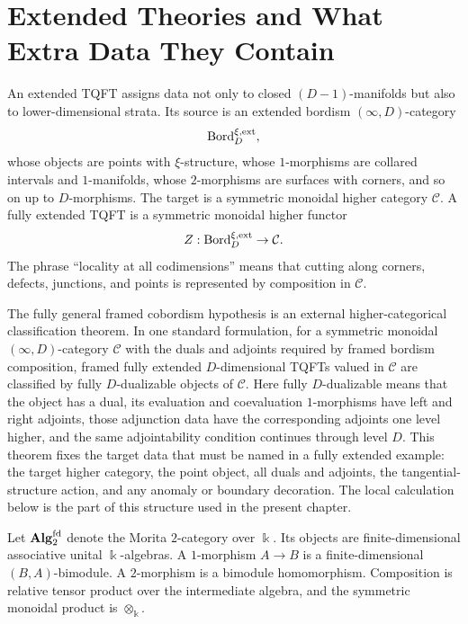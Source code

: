 \section{Extended Theories and What Extra Data They Contain}

An extended TQFT assigns data not only to closed \((D-1)\)-manifolds but also
to lower-dimensional strata.  Its source is an extended bordism
\((\infty,D)\)-category
\[
  \operatorname{Bord}^{\xi,{\rm ext}}_{D},
\]
whose objects are points with \(\xi\)-structure, whose \(1\)-morphisms are
collared intervals and \(1\)-manifolds, whose \(2\)-morphisms are surfaces
with corners, and so on up to \(D\)-morphisms.  The target is a symmetric
monoidal higher category \(\mathcal C\).  A fully extended TQFT is a
symmetric monoidal higher functor
\[
  Z:\operatorname{Bord}^{\xi,{\rm ext}}_{D}\to\mathcal C .
\]
The phrase ``locality at all codimensions'' means that cutting along corners,
defects, junctions, and points is represented by composition in
\(\mathcal C\).

\begin{remark}
\label{rem:cobordism-hypothesis-boundary}
The fully general framed cobordism hypothesis is an external
higher-categorical classification theorem.  In one standard formulation, for a
symmetric monoidal \((\infty,D)\)-category \(\mathcal C\) with the duals and
adjoints required by framed bordism composition, framed fully extended
\(D\)-dimensional TQFTs valued in \(\mathcal C\) are classified by fully
\(D\)-dualizable objects of \(\mathcal C\).  Here fully \(D\)-dualizable means
that the object has a dual, its evaluation and coevaluation \(1\)-morphisms
have left and right adjoints, those adjunction data have the corresponding
adjoints one level higher, and the same adjointability condition continues
through level \(D\).  This theorem fixes the target data that must be named in
a fully extended example: the target higher category, the point object, all
duals and adjoints, the tangential-structure action, and any anomaly or
boundary decoration.  The local calculation below is the part of this
structure used in the present chapter.
\end{remark}

\begin{definition}
\label{def:fd-morita-two-category}
Let \({\bf Alg}_2^{\rm fd}\) denote the Morita \(2\)-category over \(\Bbbk\).
Its objects are finite-dimensional associative unital \(\Bbbk\)-algebras.  A
\(1\)-morphism \(A\to B\) is a finite-dimensional \((B,A)\)-bimodule.  A
\(2\)-morphism is a bimodule homomorphism.  Composition is relative tensor
product over the intermediate algebra, and the symmetric monoidal product is
\(\otimes_{\Bbbk}\).
\end{definition}

